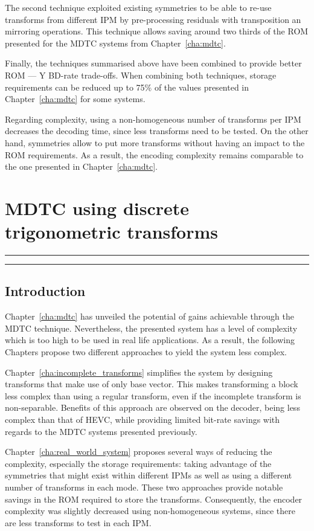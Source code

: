 \documentclass[11pt,a4paper,openright,twoside]{book}
\providecommand{\chaptertoc}{
	\startcontents[chapters]
	\hrule
	\vspace{1em}
	\printcontents[chapters]{}{1}{{\sf\large\bfseries Contents}}
	\hrule
}
\numberwithin{equation}{section} %
\numberwithin{figure}{section} %
\numberwithin{table}{section} %
\begin{document}
The second technique exploited existing symmetries to be able to re-use
transforms from different \ac{IPM} by pre-processing residuals with
transposition an mirroring operations.
This technique allows saving around two thirds of the \acs{ROM} presented for
the \ac{MDTC} systems from Chapter~\ref{cha:mdtc}.

Finally, the techniques summarised above have been combined to provide better
\acs{ROM} --- Y \ac{BD}-rate trade-offs.
When combining both techniques, storage requirements can be reduced up to 75\%
of the values presented in Chapter~\ref{cha:mdtc} for some systems.

Regarding complexity, using a non-homogeneous number of transforms per
\ac{IPM} decreases the decoding time, since less transforms need to be tested.
On the other hand, symmetries allow to put more transforms without having an
impact to the \acs{ROM} requirements.
As a result, the encoding complexity remains comparable to the one presented
in Chapter~\ref{cha:mdtc}.

\chapter{\acs{MDTC} using discrete trigonometric transforms}
\label{cha:dtt}
\chaptertoc

\section{Introduction}
\label{sec:introduction}

Chapter~\ref{cha:mdtc} has unveiled the potential of gains achievable through
the \ac{MDTC} technique.
Nevertheless, the presented system has a level of complexity which is too
high to be used in real life applications.
As a result, the following Chapters propose two different approaches to yield
the system less complex.

Chapter~\ref{cha:incomplete_transforms} simplifies the system by designing
transforms that make use of only base vector.
This makes transforming a block less complex than using a regular transform,
even if the incomplete transform is non-separable.
Benefits of this approach are observed on the decoder, being less complex than
that of \ac{HEVC}, while providing limited bit-rate savings with regards to
the \ac{MDTC} systems presented previously.

Chapter~\ref{cha:real_world_system} proposes several ways of reducing the
complexity, especially the storage requirements:
taking advantage of the symmetries that might exist within different \acp{IPM}
as well as using a different number of transforms in each mode.
These two approaches provide notable savings in the \acs{ROM} required to
store the transforms.
Consequently, the encoder complexity was slightly decreased using
non-homogeneous systems, since there are less transforms to test in each
\ac{IPM}.
\end{document}
